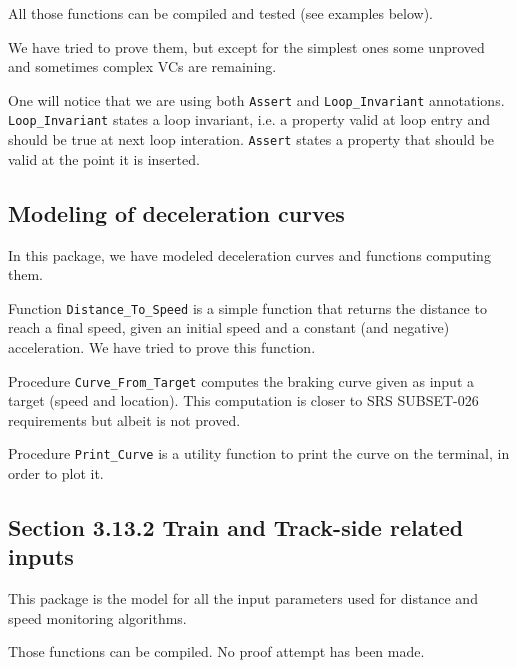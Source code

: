 \documentclass{template/openetcs_report}
\newcommand{\Ada}[1]{\lstinline[language=Ada,basicstyle={\sffamily},framesep=0pt]{#1}}
\begin{document}
All those functions can be compiled and tested (see examples below).

We have tried to prove them, but except for the simplest ones some
unproved and sometimes complex VCs are remaining.

One will notice that we are using both \Ada{Assert} and
\Ada{Loop_Invariant} annotations. \Ada{Loop_Invariant} states a loop
invariant, i.e. a property valid at loop entry and should be true at
next loop interation. \Ada{Assert} states a property that should be
valid at the point it is inserted.





\subsection{Modeling of deceleration curves}

In this package, we have modeled deceleration curves and functions
computing them.

Function \Ada{Distance_To_Speed} is a simple function that returns the
distance to reach a final speed, given an initial speed and a constant
(and negative) acceleration. We have tried to prove this function.

Procedure \Ada{Curve_From_Target} computes the braking curve given as
input a target (speed and location). This computation is closer to SRS
SUBSET-026 requirements but albeit is not proved.

Procedure \Ada{Print_Curve} is a utility function to print the curve
on the terminal, in order to plot it.





\subsection{Section 3.13.2 Train and Track-side related inputs}

This package is the model for all the input parameters used for
distance and speed monitoring algorithms.

Those functions can be compiled. No proof attempt has been made.
\end{document}
